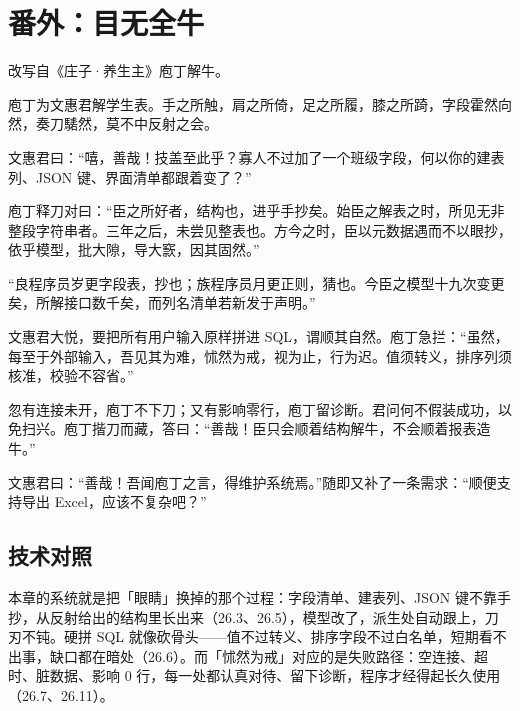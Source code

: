 \section{番外：目无全牛}

改写自《庄子·养生主》庖丁解牛。

庖丁为文惠君解学生表。手之所触，肩之所倚，足之所履，膝之所踦，字段霍然向然，奏刀騞然，莫不中反射之会。

文惠君曰：“嘻，善哉！技盖至此乎？寡人不过加了一个班级字段，何以你的建表列、JSON 键、界面清单都跟着变了？”

庖丁释刀对曰：“臣之所好者，结构也，进乎手抄矣。始臣之解表之时，所见无非整段字符串者。三年之后，未尝见整表也。方今之时，臣以元数据遇而不以眼抄，依乎模型，批大隙，导大窾，因其固然。”

“良程序员岁更字段表，抄也；族程序员月更正则，猜也。今臣之模型十九次变更矣，所解接口数千矣，而列名清单若新发于声明。”

文惠君大悦，要把所有用户输入原样拼进 SQL，谓顺其自然。庖丁急拦：“虽然，每至于外部输入，吾见其为难，怵然为戒，视为止，行为迟。值须转义，排序列须核准，校验不容省。”

忽有连接未开，庖丁不下刀；又有影响零行，庖丁留诊断。君问何不假装成功，以免扫兴。庖丁揩刀而藏，答曰：“善哉！臣只会顺着结构解牛，不会顺着报表造牛。”

文惠君曰：“善哉！吾闻庖丁之言，得维护系统焉。”随即又补了一条需求：“顺便支持导出 Excel，应该不复杂吧？”

\subsection*{技术对照}

本章的系统就是把「眼睛」换掉的那个过程：字段清单、建表列、JSON 键不靠手抄，从反射给出的结构里长出来（26.3、26.5），模型改了，派生处自动跟上，刀刃不钝。硬拼 SQL 就像砍骨头——值不过转义、排序字段不过白名单，短期看不出事，缺口都在暗处（26.6）。而「怵然为戒」对应的是失败路径：空连接、超时、脏数据、影响 0 行，每一处都认真对待、留下诊断，程序才经得起长久使用（26.7、26.11）。
